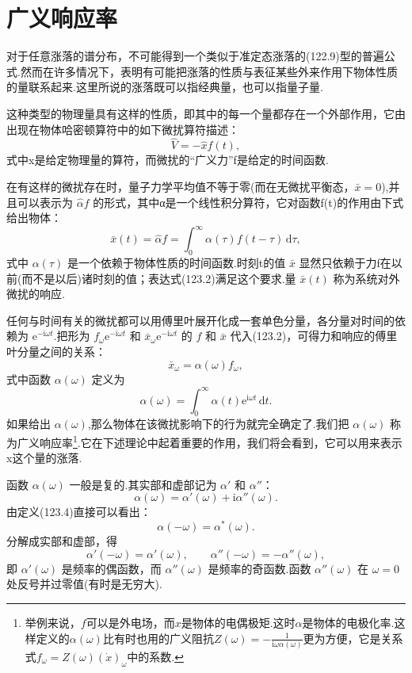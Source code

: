 \section{广义响应率}

对于任意涨落的谱分布，不可能得到一个类似于准定态涨落的(122.9)型的普遍公式.然而在许多情况下，表明有可能把涨落的性质与表征某些外来作用下物体性质的量联系起来.这里所说的涨落既可以指经典量，也可以指量子量.

这种类型的物理量具有这样的性质，即其中的每一个量都存在一个外部作用，它由出现在物体哈密顿算符中的如下微扰算符描述：
\begin{equation}
  \hat{V}=-\hat{x}f(t),
\end{equation}
式中x是给定物理量的算符，而微扰的“广义力”f是给定的时间函数.

在有这样的微扰存在时，量子力学平均值不等于零(而在无微扰平衡态，$\bar{x}=0$),并且可以表示为 $\hat{\alpha}f$ 的形式，其中α是一个线性积分算符，它对函数f(t)的作用由下式给出物体：
\begin{equation}
  \bar{x}(t)=\hat{\alpha}f=\int_0^{\infty}\alpha(\tau)f(t-\tau)\,\mathrm{d}\tau,
\end{equation}
式中 $\alpha(\tau)$ 是一个依赖于物体性质的时间函数.时刻t的值 $\bar{x}$ 显然只依赖于力f在以前(而不是以后)诸时刻的值；表达式(123.2)满足这个要求.量 $\bar{x}(t)$ 称为系统对外微扰的响应.

任何与时间有关的微扰都可以用傅里叶展开化成一套单色分量，各分量对时间的依赖为 $\mathrm{e}^{-\mathrm{i}\omega t}$.把形为 $f_\omega\mathrm{e}^{-\mathrm{i}\omega t}$ 和 $\bar{x}_\omega\mathrm{e}^{-\mathrm{i}\omega t}$ 的 $f$ 和 $\bar{x}$ 代入(123.2)，可得力和响应的傅里叶分量之间的关系：
\begin{equation}
  \bar{x}_\omega=\alpha(\omega)f_\omega,
\end{equation}
式中函数 $\alpha(\omega)$ 定义为
\begin{equation}
  \alpha(\omega)=\int_0^{\infty}\alpha(t)\mathrm{e}^{\mathrm{i}\omega t}\,\mathrm{d}t.
\end{equation}
如果给出 $\alpha(\omega)$,那么物体在该微扰影响下的行为就完全确定了.我们把 $\alpha(\omega)$ 称为广义响应率\footnote{举例来说，$f$可以是外电场，而$x$是物体的电偶极矩.这时$\alpha$是物体的电极化率.这样定义的$\alpha(\omega)$比有时也用的广义阻抗$Z(\omega)=-\frac{1}{\mathrm{i}\omega\alpha(\omega)}$更为方便，它是关系式$f_\omega=Z(\omega)(\dot{x})_\omega$中的系数.}.它在下述理论中起着重要的作用，我们将会看到，它可以用来表示x这个量的涨落.

函数 $\alpha(\omega)$ 一般是复的.其实部和虚部记为 $\alpha'$ 和 $\alpha''$：
\begin{equation}
  \alpha(\omega)=\alpha'(\omega)+\mathrm{i}\alpha''(\omega).
\end{equation}
由定义(123.4)直接可以看出：
\begin{equation}
  \alpha(-\omega)=\alpha^*(\omega).
\end{equation}
分解成实部和虚部，得
\begin{equation}
  \alpha'(-\omega)=\alpha'(\omega),\qquad
  \alpha''(-\omega)=-\alpha''(\omega),
\end{equation}
即 $\alpha'(\omega)$ 是频率的偶函数，而 $\alpha''(\omega)$ 是频率的奇函数.函数 $\alpha''(\omega)$ 在 $\omega=0$ 处反号并过零值(有时是无穷大).

